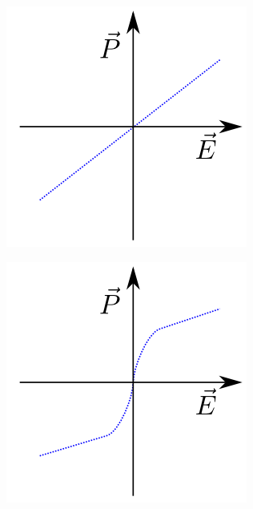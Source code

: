 \begin{figure}
\begin{subfigure}{0.3\textwidth}
\centering
	\includegraphics[width=0.9\linewidth]{./figs/chap1/dielpolplot}
	\caption{}
	\label{fig:dielplot}
\end{subfigure}
\begin{subfigure}{0.3\textwidth}
\centering
	\includegraphics[width=0.9\linewidth]{./figs/chap1/parelpolplot}

\end{subfigure}
\end{figure}

